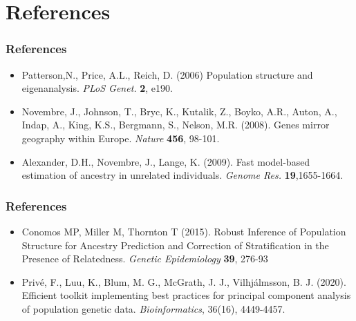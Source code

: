 \documentclass{beamer}
\begin{document}
\section{References}


\begin{frame}
	\frametitle{\bf References}
	\begin{itemize}
		\item Patterson,N., Price, A.L., Reich, D.  (2006) Population structure and eigenanalysis. {\it PLoS Genet.} \textbf{2}, e190.
			\item Novembre, J., Johnson, T., Bryc, K., Kutalik, Z., Boyko, A.R., Auton, A., Indap, A., King, K.S., Bergmann, S., Nelson, M.R. (2008). Genes mirror geography within Europe. {\it Nature}  \textbf{456}, 98-101.
		\item Alexander, D.H., Novembre, J., Lange, K. (2009). Fast model-based estimation of ancestry in unrelated individuals. {\it Genome Res.} \textbf{19},1655-1664.			
	\end{itemize}
\end{frame}



\begin{frame}
	\frametitle{\bf References}
	\begin{itemize}
			\item Conomos MP, Miller M, Thornton T (2015). Robust Inference of Population Structure for Ancestry Prediction and Correction of Stratification in the Presence of Relatedness. {\it Genetic Epidemiology} \textbf{39}, 276-93
		\item Privé, F., Luu, K., Blum, M. G., McGrath, J. J., Vilhjálmsson, B. J. (2020). Efficient toolkit implementing best practices for principal component analysis of population genetic data. \textit{Bioinformatics}, 36(16), 4449-4457.
		\end{itemize}
\end{frame}
\end{document}

